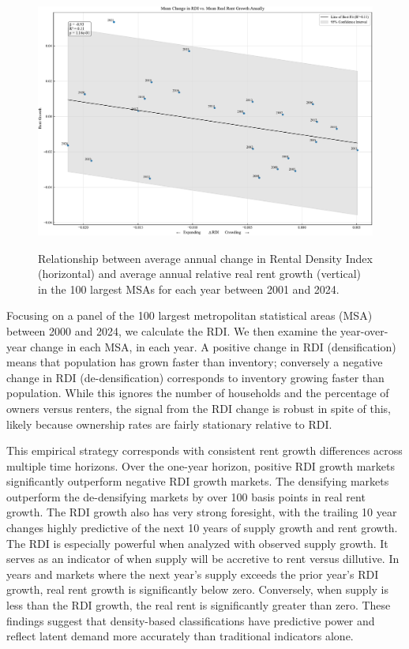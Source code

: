 \documentclass[APA,Times1COL]{WileyNJDv5} %
\begin{document}
\begin{figure}[htb!]
	\centerline{\includegraphics[height=20pc]{rdi_rent_growth_2024.pdf}}
	\caption{Relationship between average annual change in Rental Density Index (horizontal) and average annual relative real rent growth (vertical) in the 100 largest MSAs for each year between 2001 and 2024. \label{fig:rdi_national}}
\end{figure}

Focusing on a panel of the 100 largest metropolitan statistical areas (MSA) between 2000 and 2024, we calculate the RDI. We then examine the year-over-year change in each MSA, in each year. A positive change in RDI (densification) means that population has grown faster than inventory; conversely a negative change in RDI (de-densification) corresponds to inventory growing faster than population. While this ignores the number of households and the percentage of owners versus renters, the signal from the RDI change is robust in spite of this, likely because ownership rates are fairly stationary relative to RDI.

This empirical strategy corresponds with consistent rent growth differences across multiple time horizons. Over the one-year horizon, positive RDI growth  markets significantly outperform negative RDI growth markets. The densifying markets outperform the de-densifying markets by over 100 basis points in real rent growth. The RDI growth also has very strong foresight, with the trailing 10 year changes highly predictive of the next 10 years of supply growth and rent growth. The RDI is especially powerful when analyzed with observed supply growth. It serves as an indicator of when supply will be accretive to rent versus dillutive. In years and markets where the next year's supply exceeds the prior year's RDI growth, real rent growth is significantly below zero. Conversely, when supply is less than the RDI growth, the real rent is significantly greater than zero. These findings suggest that density-based classifications have predictive power and reflect latent demand more accurately than traditional indicators alone.
\end{document}
